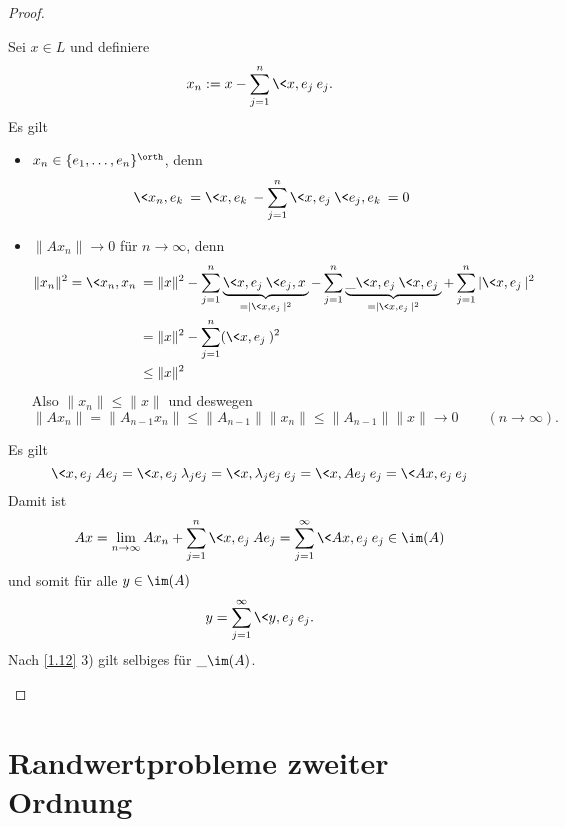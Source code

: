 \begin{st}
\begin{proof}
\begin{enumerate}[1)]
				Sei $x \in L$ und definiere
				\[
					x_n := x - \sum_{j=1}^n \<x,e_j\> e_j.
				\]
				Es gilt
				\begin{itemize}
					\item
						$x_n \in \{e_1,\dotsc,e_n\}^\orth$, denn
						\[
							\<x_n, e_k\> = \<x, e_k\> - \sum_{j=1}^n \<x,e_j\> \<e_j, e_k\> = 0
						\]
					\item
						$\|Ax_n\| \to 0$ für $n\to \infty$, denn
						\begin{align*}
							\|x_n\|^2  = \<x_n, x_n\>
							&= \|x\|^2 - \sum_{j=1}^n \underbrace{\<x,e_j\>\<e_j,x\>}_{=|\<x,e_j\>|^2} - \sum_{j=1}^n \underbrace{\_{\<x,e_j\>} \<x,e_j\>}_{=|\<x,e_j\>|^2} + \sum_{j=1}^n |\<x,e_j\>|^2 \\
							&= \|x\|^2 - \sum_{j=1}^n (\<x,e_j\>)^2 \\
							&\le \|x\|^2
						\end{align*}
						Also $\|x_n\| \le \|x\|$ und deswegen
						\[
							\|Ax_n\| = \|A_{n-1}x_n\| \le \|A_{n-1}\| \|x_n\| \le \|A_{n-1}\| \|x\| \to 0
							\qquad (n \to \infty).
						\]
				\end{itemize}
				Es gilt
				\[
					\<x,e_j\> A e_j
					= \<x,e_j\> \lambda_j e_j
					= \<x,\lambda_j e_j\> e_j
					= \<x,A e_j\> e_j
					= \<Ax,e_j\> e_j
				\]
				Damit ist
				\[
					Ax = \lim_{n\to\infty} Ax_n + \sum_{j=1}^n \<x,e_j\> Ae_j = \sum_{j=1}^\infty \<Ax, e_j\> e_j \in \im (A)
				\]
				und somit für alle $y \in \im (A)$
				\[
					y = \sum_{j=1}^\infty \<y,e_j\> e_j.
				\]
				Nach \ref{1.12} 3) gilt selbiges für $\_{\im (A)}$.
		\end{enumerate}
	\end{proof}
\end{st}


\section{Randwertprobleme zweiter Ordnung}


